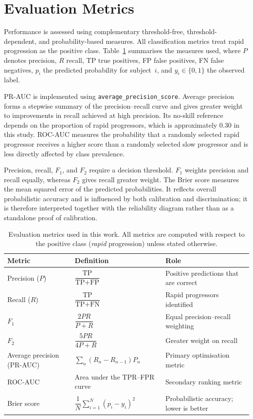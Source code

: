 \section{Evaluation Metrics}
\label{sec:methods_metrics}
Performance is assessed using complementary threshold-free, threshold-dependent, and probability-based measures. All classification metrics treat rapid progression as the positive class. Table~\ref{tab:metrics} summarises the measures used, where $P$ denotes precision, $R$ recall, TP true positives, FP false positives, FN false negatives, $p_i$ the predicted probability for subject~$i$, and $y_i \in \{0,1\}$ the observed label.

\gls{PR-AUC} is implemented using \texttt{average\_precision\_score}. Average precision forms a stepwise summary of the precision--recall curve and gives greater weight to improvements in recall achieved at high precision. Its no-skill reference depends on the proportion of rapid progressors, which is approximately 0.30 in this study. \gls{ROC-AUC} measures the probability that a randomly selected rapid progressor receives a higher score than a randomly selected slow progressor and is less directly affected by class prevalence.

Precision, recall, $F_1$, and $F_2$ require a decision threshold. $F_1$ weights precision and recall equally, whereas $F_2$ gives recall greater weight. The Brier score measures the mean squared error of the predicted probabilities. It reflects overall probabilistic accuracy and is influenced by both calibration and discrimination; it is therefore interpreted together with the reliability diagram rather than as a standalone proof of calibration.

\begin{table}[ht!]
\centering
\caption[Evaluation metrics definitions]{Evaluation metrics used in this work. All metrics are computed with respect to the positive class (\textit{rapid} progression) unless stated otherwise.}
\label{tab:metrics}
\small
\renewcommand{\arraystretch}{1.8}
\begin{tabular}{l l l}
\toprule
Metric & Definition & Role \\
\midrule
Precision ($P$) & $\dfrac{\text{TP}}{\text{TP} + \text{FP}}$ & Positive predictions that are correct \\
Recall ($R$) & $\dfrac{\text{TP}}{\text{TP} + \text{FN}}$ & Rapid progressors identified \\
$F_1$ & $\dfrac{2PR}{P + R}$ & Equal precision--recall weighting \\
$F_2$ & $\dfrac{5PR}{4P + R}$ & Greater weight on recall \\
Average precision (PR-AUC) & $\displaystyle\sum_{n}(R_n - R_{n-1})P_n$ & Primary optimisation metric \\
\gls{ROC-AUC} & Area under the TPR--FPR curve & Secondary ranking metric \\
Brier score & $\dfrac{1}{N}\displaystyle\sum_{i=1}^{N}(p_i-y_i)^2$ & Probabilistic accuracy; lower is better \\
\bottomrule
\end{tabular}
\renewcommand{\arraystretch}{1.0}
\end{table}

